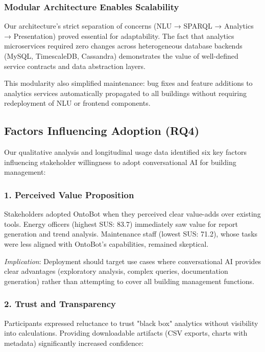 \documentclass[acmlarge]{acmart}
\begin{document}
\subsubsection{Modular Architecture Enables Scalability}

Our architecture's strict separation of concerns (NLU → SPARQL → Analytics → Presentation) proved essential for adaptability. The fact that analytics microservices required zero changes across heterogeneous database backends (MySQL, TimescaleDB, Cassandra) demonstrates the value of well-defined service contracts and data abstraction layers.

This modularity also simplified maintenance: bug fixes and feature additions to analytics services automatically propagated to all buildings without requiring redeployment of NLU or frontend components.

\subsection{Factors Influencing Adoption (RQ4)}

Our qualitative analysis and longitudinal usage data identified six key factors influencing stakeholder willingness to adopt conversational AI for building management:

\subsubsection{1. Perceived Value Proposition}

Stakeholders adopted OntoBot when they perceived clear value-adds over existing tools. Energy officers (highest SUS: 83.7) immediately saw value for report generation and trend analysis. Maintenance staff (lowest SUS: 71.2), whose tasks were less aligned with OntoBot's capabilities, remained skeptical.

\textit{Implication}: Deployment should target use cases where conversational AI provides clear advantages (exploratory analysis, complex queries, documentation generation) rather than attempting to cover all building management functions.

\subsubsection{2. Trust and Transparency}

Participants expressed reluctance to trust "black box" analytics without visibility into calculations. Providing downloadable artifacts (CSV exports, charts with metadata) significantly increased confidence:
\end{document}
